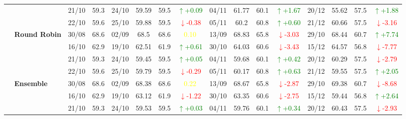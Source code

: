 \documentclass{ieeeaccess}
\begin{document}
{\begin{longtable}{llcc|cccc|cccc|cccc}
&
& 21/10 & 59.3 & 24/10 & 59.59 & 59.5 & \textcolor{green}{\(\uparrow\)+0.09} & 04/11 & 61.77 & 60.1 & \textcolor{green}{\(\uparrow\)+1.67} & 20/12 & 55.62 & 57.5 & \textcolor{green}{\(\uparrow\)+1.88} \\

&
& 22/10 & 59.6 & 25/10 & 59.88 & 59.5 & \textcolor{red}{\(\downarrow\)-0.38} & 05/11 & 60.2 & 60.8 & \textcolor{green}{\(\uparrow\)+0.60} & 21/12 & 60.66 & 57.5 & \textcolor{red}{\(\downarrow\)-3.16} \\
\cmidrule(lr){2-16}


& \textbf{Round Robin}
& 30/08 & 68.6 & 02/09 & 68.5 & 68.6 & \textcolor{yellow}{0.10} & 13/09 & 68.83 & 65.8 & \textcolor{red}{\(\downarrow\)-3.03} & 29/10 & 68.44 & 60.7 & \textcolor{green}{\(\uparrow\)+7.74} \\

&
& 16/10 & 62.9 & 19/10 & 62.51 & 61.9 & \textcolor{green}{\(\uparrow\)+0.61} & 30/10 & 64.03 & 60.6 & \textcolor{red}{\(\downarrow\)-3.43} & 15/12 & 64.57 & 56.8 & \textcolor{red}{\(\downarrow\)-7.77} \\

&
& 21/10 & 59.3 & 24/10 & 59.45 & 59.5 & \textcolor{green}{\(\uparrow\)+0.05} & 04/11 & 59.68 & 60.1 & \textcolor{green}{\(\uparrow\)+0.42} & 20/12 & 60.29 & 57.5 & \textcolor{red}{\(\downarrow\)-2.79} \\

&
& 22/10 & 59.6 & 25/10 & 59.79 & 59.5 & \textcolor{red}{\(\downarrow\)-0.29} & 05/11 & 60.17 & 60.8 & \textcolor{green}{\(\uparrow\)+0.63} & 21/12 & 59.55 & 57.5 & \textcolor{green}{\(\uparrow\)+2.05} \\
\cmidrule(lr){2-16}

& \textbf{Ensemble}
& 30/08 & 68.6 & 02/09 & 68.38 & 68.6 & \textcolor{yellow}{0.22} & 13/09 & 68.67 & 65.8 & \textcolor{red}{\(\downarrow\)-2.87} & 29/10 & 69.38 & 60.7 & \textcolor{red}{\(\downarrow\)-8.68} \\

&
& 16/10 & 62.9 & 19/10 & 63.12 & 61.9 & \textcolor{red}{\(\downarrow\)-1.22} & 30/10 & 63.35 & 60.6 & \textcolor{red}{\(\downarrow\)-2.75} & 15/12 & 59.44 & 56.8 & \textcolor{green}{\(\uparrow\)+2.64} \\

&
& 21/10 & 59.3 & 24/10 & 59.53 & 59.5 & \textcolor{green}{\(\uparrow\)+0.03} & 04/11 & 59.76 & 60.1 & \textcolor{green}{\(\uparrow\)+0.34} & 20/12 & 60.43 & 57.5 & \textcolor{red}{\(\downarrow\)-2.93} \\


\end{longtable}}
\end{document}
